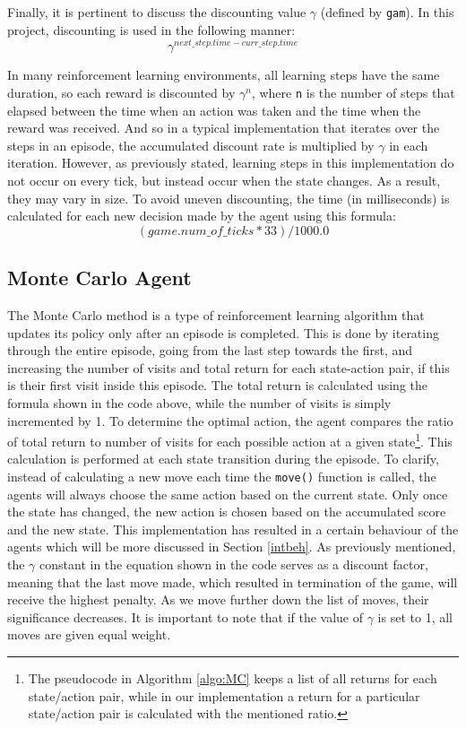 Finally, it is pertinent to discuss the discounting value $\gamma$ (defined by \texttt{gam}). In this project, discounting is used in the following manner: $$\gamma^{next\_step.time - curr\_step.time}$$

In many reinforcement learning environments, all learning steps have the same duration, so each reward is discounted by $\gamma^{n}$, where \texttt{n} is the number of steps that elapsed between the time when an action was taken and the time when the reward was received.  And so in a typical implementation that iterates over the steps in an episode, the accumulated discount rate is multiplied by $\gamma$ in each iteration. However, as previously stated, learning steps in this implementation do not occur on every tick, but instead occur when the state changes. As a result, they may vary in size. To avoid uneven discounting, the time (in milliseconds) is calculated for each new decision made by the agent using this formula:  $$(game.num\_of\_ticks * 33) / 1000.0$$

\subsection{Monte Carlo Agent}
The Monte Carlo method is a type of reinforcement learning algorithm that updates its policy only after an episode is completed. This is done by iterating through the entire episode, going from the last step towards the first, and increasing the number of visits and total return for each state-action pair, if this is their first visit inside this episode. The total return is calculated using the formula shown in the code above, while the number of visits is simply incremented by 1. To determine the optimal action, the agent compares the ratio of total return to number of visits for each possible action at a given state\footnote{The pseudocode in Algorithm \ref{algo:MC} keeps a list of all returns for each state/action pair, while in our implementation a return for a particular state/action pair is calculated with the mentioned ratio.}. This calculation is performed at each state transition during the episode. To clarify, instead of calculating a new move each time the \texttt{move()} function is called, the agents will always choose the same action based on the current state. Only once the state has changed, the new action is chosen based on the accumulated score and the new state. This implementation has resulted in a certain behaviour of the agents which will be more discussed in Section \ref{intbeh}.
As previously mentioned, the $\gamma$ constant in the equation shown in the code serves as a discount factor, meaning that the last move made, which resulted in termination of the game, will receive the highest penalty. As we move further down the list of moves, their significance decreases. It is important to note that if the value of $\gamma$ is set to 1, all moves are given equal weight. 


